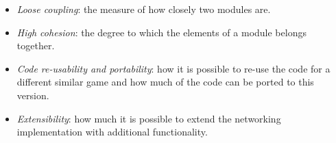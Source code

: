 \begin{itemize}[noitemsep]
	\item \textit{Loose coupling}: the measure of how closely two modules are.
	\item \textit{High cohesion}: the degree to which the elements of a module belongs together.
	\item \textit{Code re-usability and portability}: how it is possible to re-use the code for a different similar game and how much of the code can be ported to this version.
	\item \textit{Extensibility}: how much it is possible to extend the networking implementation with additional functionality.
\end{itemize}